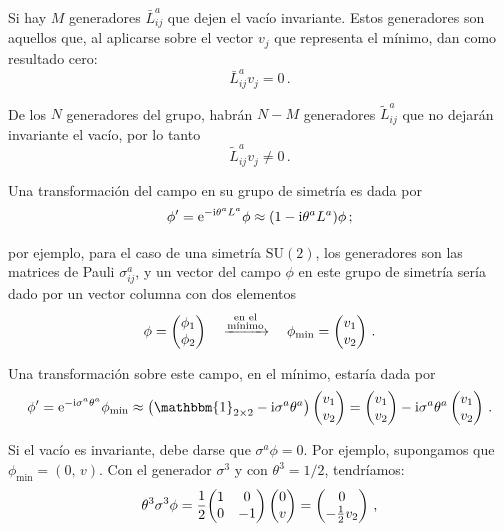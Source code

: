 Si hay $M$ generadores $\bar{L}^a_{ij}$ que dejen el vacío invariante. Estos generadores son aquellos que, al aplicarse sobre el vector $v_j$ que representa el mínimo, dan como resultado cero:
%
\begin{equation}
    \bar{L}^a_{ij} v_j = 0 \,.
\end{equation}

De los $N$ generadores del grupo, habrán $N-M$ generadores $\tilde{L}^a_{ij}$ que no dejarán invariante el vacío, por lo tanto
%
\begin{equation}
    \tilde{L}^a_{ij} v_j \neq 0 \,.
\end{equation}

Una transformación del campo en su grupo de simetría es dada por
%
\begin{equation}
    \phi' = \mathrm{e}^{-\mathrm{i} \theta^a L^a} \phi \approx \qty(1 - \mathrm{i} \theta^a L^a) \phi \,;
\end{equation}

\noindent por ejemplo, para el caso de una simetría $\mathrm{SU}(2)$, los generadores son las matrices de Pauli $\sigma_{ij}^a$, y un vector del campo $\phi$ en este grupo de simetría sería dado por un vector columna con dos elementos
%
\begin{equation}
    \phi = \pmqty{\phi_1 \\ \phi_2} \quad \xrightarrow{\substack{\text{en el} \\ \text{mínimo}}} \quad \phi_{\text{min}} = \pmqty{v_1 \\ v_2} \,.
\end{equation}

Una transformación sobre este campo, en el mínimo, estaría dada por
%
\begin{equation}
    \phi' = \ee^{-\ii \sigma^a \theta^a} \phi_{\text{min}} \approx \qty(\mathbbm{1}_{2 \times 2} - \ii \sigma^a \theta^a) \pmqty{v_1 \\ v_2} = \pmqty{v_1 \\ v_2} - \ii \sigma^a \theta^a \pmqty{v_1 \\ v_2} \,.
\end{equation}

Si el vacío es invariante, debe darse que $\sigma^a \phi = 0$. Por ejemplo, supongamos que $\phi_{\text{min}} = (0,\, v)$. Con el generador $\sigma^3$ y con $\theta^3 = 1/2$, tendríamos:
%
\begin{equation}
    \theta^3 \sigma^3 \phi = \frac{1}{2} \mqty(\pmat{3}) \pmqty{0 \\ v} = \pmqty{0 \\ -\tfrac{1}{2}v_2} \,,
\end{equation}

